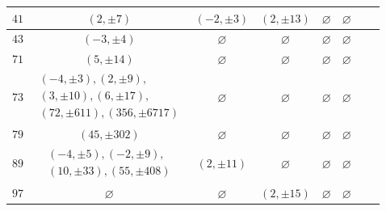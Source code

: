 \documentclass[12pt]{amsart}
\newcommand{\?}{\color{red}?}
\numberwithin{equation}{section}
\begin{document}
\begin{center}
\begin{table}
\begin{tabular}{|c|c|c|c|c|c|cl}
$41$ & $(2,\pm 7)$   & $(-2,\pm 3)$ & $(2,\pm 13)$ & $\varnothing$ & $\varnothing$\\ \hline
$43$ & $(-3,\pm 4) $  & $\varnothing$ & $\varnothing$ & $\varnothing$ & $\varnothing$\\ \hline
$71$ & $(5, \pm 14)$  & $\varnothing$ & $\varnothing$ & $\varnothing$ & $\varnothing$\\ \hline
$73$ & $\begin{aligned}(-4,\pm 3), (2,\pm 9), \\ (3,\pm 10),
 (6,\pm 17),\\  (72,\pm 611), (356, \pm 6717)\end{aligned}$  & $\varnothing$ & $\varnothing$ & $\varnothing$ & $\varnothing$\\ \hline
$79$ & $(45,\pm 302) $  & $\varnothing$ & $\varnothing$ & $\varnothing$ & $\varnothing$\\ \hline
$89$ & $\begin{aligned}(-4, \pm 5), (-2, \pm 9), \\
(10,\pm 33), (55,\pm 408)\end{aligned}$  & $(2,\pm 11)$ & $\varnothing$ & $\varnothing$ & $\varnothing$\\ \hline
$97$ & $\varnothing $  & $\varnothing$ & $(2,\pm 15)$ & $\varnothing$ & $\varnothing$\\ \hline
\end{tabular}
\medskip
{}
\label{Cplustable}
\end{table}
\end{center}
\endgroup
\end{document}
